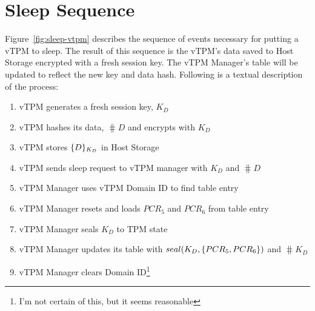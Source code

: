 \documentclass[10pt]{article}
\begin{document}
\section{Sleep Sequence}

Figure~\ref{fig:sleep-vtpm} describes the sequence of events necessary
for putting a vTPM to sleep.  The result of this sequence is the
vTPM's data saved to Host Storage encrypted with a fresh session key.
The vTPM Manager's table will be updated to reflect the new key and
data hash.  Following is a textual description of the process:

\begin{enumerate}
  \parskip=0pt\itemsep=0pt
\item vTPM generates a fresh session key, $K_D$
\item vTPM hashes its data, $\hash{D}$ and encrypts with $K_D$
\item vTPM stores $\{D\}_{K_D}$ in Host Storage
\item vTPM sends sleep request to vTPM manager with $K_D$ and
  $\hash{D}$
\item vTPM Manager uses vTPM Domain ID to find table entry
\item vTPM Manager resets and loads $PCR_5$ and $PCR_6$ from table
  entry
\item vTPM Manager seals $K_D$ to TPM state
\item vTPM Manager updates its table with
  $seal(K_D,\{PCR_5,PCR_6\})$ and $\hash{K_D}$
\item vTPM Manager clears Domain ID\footnote{I'm not certain of this,
    but it seems reasonable}
\end{enumerate}
\end{document}
